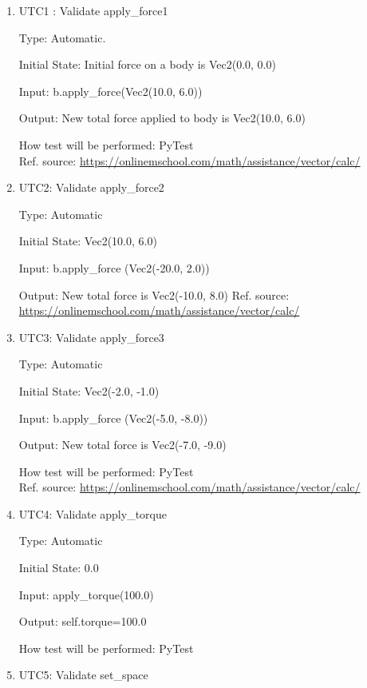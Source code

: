 \documentclass[12pt, titlepage]{article}
\begin{document}
\begin{enumerate}
	

\item{UTC1} {: Validate apply\_force1 \\}

Type: Automatic.
					
Initial State: Initial force on a body is Vec2(0.0, 0.0)
					
Input: b.apply\_force(Vec2(10.0, 6.0))
					
Output: New total force applied to body is Vec2(10.0, 6.0)
					
How test will be performed: PyTest\\ 
Ref. source: \url{https://onlinemschool.com/math/assistance/vector/calc/}
					
\item{UTC2}{: Validate apply\_force2\\}

Type: Automatic
					
Initial State: Vec2(10.0, 6.0)
					
Input: b.apply\_force (Vec2(-20.0, 2.0))
					
Output: New total force is Vec2(-10.0, 8.0)
Ref. source: \url{https://onlinemschool.com/math/assistance/vector/calc/}

\item{UTC3}{: Validate apply\_force3\\}

Type: Automatic

Initial State: Vec2(-2.0, -1.0)

Input: b.apply\_force (Vec2(-5.0, -8.0))

Output: New total force is Vec2(-7.0, -9.0)
					
How test will be performed: PyTest\\
Ref. source: \url{https://onlinemschool.com/math/assistance/vector/calc/}

\item{UTC4}{: Validate apply\_torque\\}

Type: Automatic

Initial State: 0.0

Input: apply\_torque(100.0)

Output: self.torque=100.0

How test will be performed: PyTest

\item{UTC5}{: Validate set\_space\\}


\end{enumerate}
\end{document}
